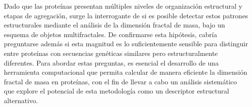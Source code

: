 Dado que las proteínas presentan múltiples niveles de organización estructural y etapas de agregación, surge la interrogante de si es posible detectar estos patrones estructurales mediante el análisis de la dimensión fractal de masa, bajo un esquema de objetos multifractales. De confirmarse esta hipótesis, cabría preguntarse además si esta magnitud es lo suficientemente sensible para distinguir entre proteínas con secuencias genéticas similares pero estructuralmente diferentes. Para abordar estas preguntas, es esencial el desarrollo de una herramienta computacional que permita calcular de manera eficiente la dimensión fractal de masa en proteínas, con el fin de llevar a cabo un análisis sistemático que explore el potencial de esta metodología como un descriptor estructural alternativo.


















